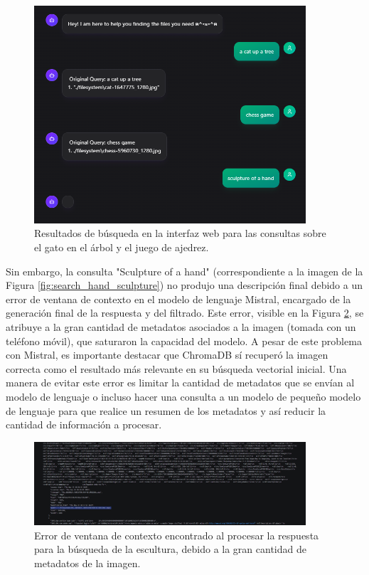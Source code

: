 \begin{figure}[H]
\centering
\includegraphics[width=0.9\textwidth]{archivos/web_multiple_results.png}
\caption[Resultados de búsqueda para gato y ajedrez]{Resultados de búsqueda en la interfaz web para las consultas sobre el gato en el árbol y el juego de ajedrez.}
\label{fig:web_search_results_cat_chess}
\end{figure}

Sin embargo, la consulta "Sculpture of a hand" (correspondiente a la imagen de la Figura \ref{fig:search_hand_sculpture}) no produjo una descripción final debido a un error de ventana de contexto en el modelo de lenguaje Mistral, encargado de la generación final de la respuesta y del filtrado. Este error, visible en la Figura \ref{fig:context_window_error_search}, se atribuye a la gran cantidad de metadatos asociados a la imagen (tomada con un teléfono móvil), que saturaron la capacidad del modelo. A pesar de este problema con Mistral, es importante destacar que ChromaDB sí recuperó la imagen correcta como el resultado más relevante en su búsqueda vectorial inicial.
Una manera de evitar este error es limitar la cantidad de metadatos que se envían al modelo de lenguaje o incluso hacer una consulta a un modelo de pequeño modelo de lenguaje para que realice un resumen de los metadatos y así reducir la cantidad de información a procesar.

\begin{figure}[H]
\centering
\includegraphics[width=0.9\textwidth]{archivos/context_window_error.png}
\caption[Error de ventana de contexto en búsqueda]{Error de ventana de contexto encontrado al procesar la respuesta para la búsqueda de la escultura, debido a la gran cantidad de metadatos de la imagen.}
\label{fig:context_window_error_search}
\end{figure}

